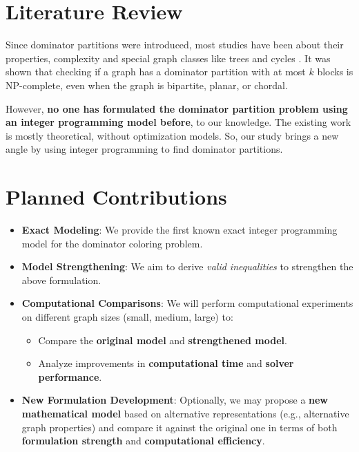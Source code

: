 \documentclass[12pt]{article}
\begin{document}
\section{Literature Review}

Since dominator partitions were introduced, most studies have been about their properties, complexity and special graph classes like trees and cycles \cite{dominator_partitions}. It was shown that checking if a graph has a dominator partition with at most $k$ blocks is NP-complete, even when the graph is bipartite, planar, or chordal.

However, \textbf{no one has formulated the dominator partition problem using an integer programming model before}, to our knowledge. The existing work is mostly theoretical, without optimization models. So, our study brings a new angle by using integer programming to find dominator partitions.

\clearpage



\section{Planned Contributions}
\begin{itemize}[leftmargin=*, noitemsep]
    \item \textbf{Exact Modeling}: We provide the first known exact integer programming model for the dominator coloring problem.
    \item \textbf{Model Strengthening}: We aim to derive \textit{valid inequalities} to strengthen the above formulation.
    \item \textbf{Computational Comparisons}: We will perform computational experiments on different graph sizes (small, medium, large) to:
    \begin{itemize}[noitemsep]
        \item Compare the \textbf{original model} and \textbf{strengthened model}.
        \item Analyze improvements in \textbf{computational time} and \textbf{solver performance}.
    \end{itemize}
    \item \textbf{New Formulation Development}: Optionally, we may propose a \textbf{new mathematical model} based on alternative representations (e.g., alternative graph properties) and compare it against the original one in terms of both \textbf{formulation strength} and \textbf{computational efficiency}.
\end{itemize}
\end{document}
